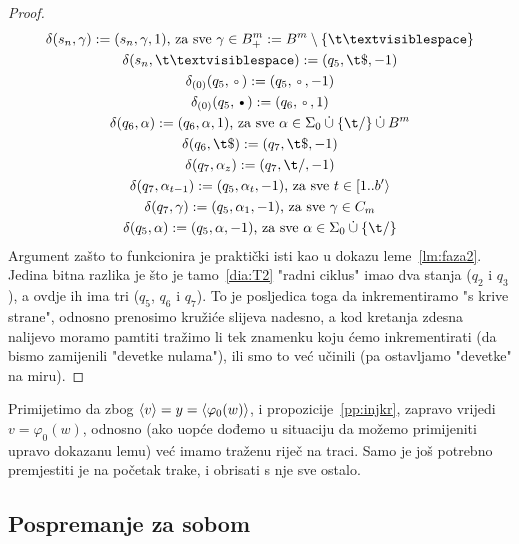 \begin{proof}
\noindent\begin{gather}
\label{d:71}
    \delta(s_n,\gamma):=(s_n,\gamma,1)\text{, za sve } \gamma\in B^m_+:=B^m\setminus\{\bl\}\\
\label{d:72}
    \delta(s_n,\bl):=(q_5,\t\$,-1)\\
\label{d:73}
    \delta_{(0)}(q_5,\text\textopenbullet):=(q_5,\text\textopenbullet,-1)\\
\label{d:74}
    \delta_{(0)}(q_5,\text\textbullet):=(q_6,\text\textopenbullet,1)\\
\label{d:75}
    \delta(q_6,\alpha):=(q_6,\alpha,1)\text{, za sve }\alpha\in\Sigma_0\mathbin{\dot\cup}\{\t/\}\mathbin{\dot\cup}B^m\\
\label{d:76}
    \delta(q_6,\t\$):=(q_7,\t\$,-1)\\
\label{d:77}
    \delta(q_7,\alpha_z):=(q_7,\t/,-1)\\
\label{d:78}
    \delta(q_7,\alpha_{t-1}):=(q_5,\alpha_t,-1)\text{, za sve }t\in[1..b'\rangle\\
\label{d:79}
    \delta(q_7,\gamma):=(q_5,\alpha_1,-1)\text{, za sve }\gamma\in C_m\\
\label{d:70}
    \delta(q_5,\alpha):=(q_5,\alpha,-1)\text{, za sve }\alpha\in\Sigma_0\mathbin{\dot\cup}\{\t/\}
\end{gather}
Argument zašto to funkcionira je praktički isti kao u dokazu leme~\ref{lm:faza2}. Jedina bitna razlika je što je tamo~\eqref{dia:T2} "radni ciklus" imao dva stanja ($q_2$ i $q_3$), a ovdje ih ima tri ($q_5$, $q_6$ i $q_7$). To je posljedica toga da inkrementiramo "s krive strane", odnosno prenosimo kružiće slijeva nadesno, a kod kretanja zdesna nalijevo moramo pamtiti tražimo li tek znamenku koju ćemo inkrementirati (da bismo zamijenili "devetke nulama"), ili smo to već učinili (pa ostavljamo "devetke" na miru).
\end{proof}

Primijetimo da zbog $\langle v\rangle=y=\langle\varphi_0(w)\rangle$, i propozicije~\ref{pp:injkr}, zapravo vrijedi $v=\varphi_0(w)$, odnosno (ako uopće dođemo u situaciju da možemo primijeniti upravo dokazanu lemu) već imamo traženu riječ na traci. Samo je još potrebno premjestiti je na početak trake, i obrisati s nje sve ostalo.

\subsection{Pospremanje za sobom}

